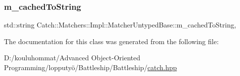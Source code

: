 \subsubsection{\texorpdfstring{m\+\_\+cached\+To\+String}{m\_cachedToString}}
{\footnotesize\ttfamily std\+::string Catch\+::\+Matchers\+::\+Impl\+::\+Matcher\+Untyped\+Base\+::m\+\_\+cached\+To\+String\hspace{0.3cm}{\ttfamily [mutable]}, {\ttfamily [protected]}}



The documentation for this class was generated from the following file\+:\begin{DoxyCompactItemize}
\item 
D\+:/kouluhommat/\+Advanced Object-\/\+Oriented Programming/lopputyö/\+Battleship/\+Battleship/\mbox{\hyperlink{catch_8hpp}{catch.\+hpp}}\end{DoxyCompactItemize}
